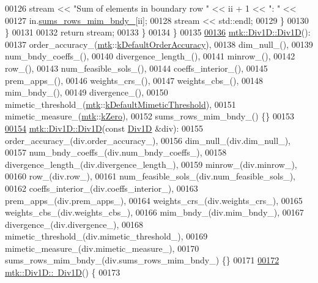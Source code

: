 \begin{DoxyCode}
00126       stream << \textcolor{stringliteral}{"Sum of elements in boundary row "} << ii + 1 << \textcolor{stringliteral}{": "} <<
00127         in.\hyperlink{classmtk_1_1Div1D_aab7f0333d4156efa92e2089295decebc}{sums\_rows\_mim\_bndy\_}[ii];
00128       stream << std::endl;
00129     \}
00130   \}
00131 
00132   \textcolor{keywordflow}{return} stream;
00133 \}
00134 \}
00135 
\hypertarget{mtk__div__1d_8cc_source_l00136}{}\hyperlink{classmtk_1_1Div1D_a339c66dd4ed8f50cbeda3645de18e5ab}{00136} \hyperlink{classmtk_1_1Div1D_a339c66dd4ed8f50cbeda3645de18e5ab}{mtk::Div1D::Div1D}():
00137   order\_accuracy\_(\hyperlink{namespacemtk}{mtk}::\hyperlink{group__c01-roots_ga0d95560098eb36420511103637b6952f}{kDefaultOrderAccuracy}),
00138   dim\_null\_(),
00139   num\_bndy\_coeffs\_(),
00140   divergence\_length\_(),
00141   minrow\_(),
00142   row\_(),
00143   num\_feasible\_sols\_(),
00144   coeffs\_interior\_(),
00145   prem\_apps\_(),
00146   weights\_crs\_(),
00147   weights\_cbs\_(),
00148   mim\_bndy\_(),
00149   divergence\_(),
00150   mimetic\_threshold\_(\hyperlink{namespacemtk}{mtk}::\hyperlink{group__c01-roots_ga35718d949bdc81a08a9cc8ebbe3478a2}{kDefaultMimeticThreshold}),
00151   mimetic\_measure\_(\hyperlink{namespacemtk}{mtk}::\hyperlink{group__c01-roots_ga59a451a5fae30d59649bcda274fea271}{kZero}),
00152   sums\_rows\_mim\_bndy\_() \{\}
00153 
\hypertarget{mtk__div__1d_8cc_source_l00154}{}\hyperlink{classmtk_1_1Div1D_a25376152cf97aa27f6b61bcb62b4ea7a}{00154} \hyperlink{classmtk_1_1Div1D_a339c66dd4ed8f50cbeda3645de18e5ab}{mtk::Div1D::Div1D}(\textcolor{keyword}{const} \hyperlink{classmtk_1_1Div1D}{Div1D} &div):
00155   order\_accuracy\_(div.order\_accuracy\_),
00156   dim\_null\_(div.dim\_null\_),
00157   num\_bndy\_coeffs\_(div.num\_bndy\_coeffs\_),
00158   divergence\_length\_(div.divergence\_length\_),
00159   minrow\_(div.minrow\_),
00160   row\_(div.row\_),
00161   num\_feasible\_sols\_(div.num\_feasible\_sols\_),
00162   coeffs\_interior\_(div.coeffs\_interior\_),
00163   prem\_apps\_(div.prem\_apps\_),
00164   weights\_crs\_(div.weights\_crs\_),
00165   weights\_cbs\_(div.weights\_cbs\_),
00166   mim\_bndy\_(div.mim\_bndy\_),
00167   divergence\_(div.divergence\_),
00168   mimetic\_threshold\_(div.mimetic\_threshold\_),
00169   mimetic\_measure\_(div.mimetic\_measure\_),
00170   sums\_rows\_mim\_bndy\_(div.sums\_rows\_mim\_bndy\_) \{\}
00171 
\hypertarget{mtk__div__1d_8cc_source_l00172}{}\hyperlink{classmtk_1_1Div1D_ac2c215f42b8da513df2a4ee477b5fa1f}{00172} \hyperlink{classmtk_1_1Div1D_ac2c215f42b8da513df2a4ee477b5fa1f}{mtk::Div1D::~Div1D}() \{
00173 

\end{DoxyCode}
